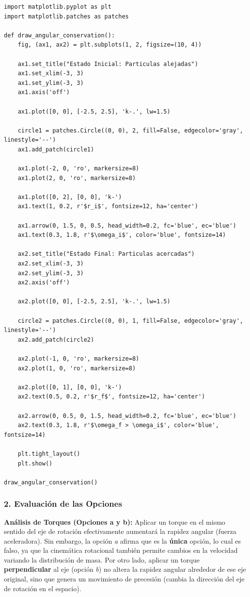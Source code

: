 \documentclass[12pt, a4paper]{article}
\begin{document}
\begin{lstlisting}
import matplotlib.pyplot as plt
import matplotlib.patches as patches

def draw_angular_conservation():
    fig, (ax1, ax2) = plt.subplots(1, 2, figsize=(10, 4))
    
    ax1.set_title("Estado Inicial: Particulas alejadas")
    ax1.set_xlim(-3, 3)
    ax1.set_ylim(-3, 3)
    ax1.axis('off')
    
    ax1.plot([0, 0], [-2.5, 2.5], 'k-.', lw=1.5)
    
    circle1 = patches.Circle((0, 0), 2, fill=False, edgecolor='gray', linestyle='--')
    ax1.add_patch(circle1)
    
    ax1.plot(-2, 0, 'ro', markersize=8)
    ax1.plot(2, 0, 'ro', markersize=8)
    
    ax1.plot([0, 2], [0, 0], 'k-')
    ax1.text(1, 0.2, r'$r_i$', fontsize=12, ha='center')
    
    ax1.arrow(0, 1.5, 0, 0.5, head_width=0.2, fc='blue', ec='blue')
    ax1.text(0.3, 1.8, r'$\omega_i$', color='blue', fontsize=14)
    
    ax2.set_title("Estado Final: Particulas acercadas")
    ax2.set_xlim(-3, 3)
    ax2.set_ylim(-3, 3)
    ax2.axis('off')
    
    ax2.plot([0, 0], [-2.5, 2.5], 'k-.', lw=1.5)
    
    circle2 = patches.Circle((0, 0), 1, fill=False, edgecolor='gray', linestyle='--')
    ax2.add_patch(circle2)
    
    ax2.plot(-1, 0, 'ro', markersize=8)
    ax2.plot(1, 0, 'ro', markersize=8)
    
    ax2.plot([0, 1], [0, 0], 'k-')
    ax2.text(0.5, 0.2, r'$r_f$', fontsize=12, ha='center')
    
    ax2.arrow(0, 0.5, 0, 1.5, head_width=0.2, fc='blue', ec='blue')
    ax2.text(0.3, 1.8, r'$\omega_f > \omega_i$', color='blue', fontsize=14)
    
    plt.tight_layout()
    plt.show()

draw_angular_conservation()
\end{lstlisting}

\subsubsection*{2. Evaluación de las Opciones}

\textbf{Análisis de Torques (Opciones a y b):}
Aplicar un torque en el mismo sentido del eje de rotación efectivamente aumentará la rapidez angular (fuerza aceleradora). Sin embargo, la opción \textit{a} afirma que es la \textbf{única} opción, lo cual es falso, ya que la cinemática rotacional también permite cambios en la velocidad variando la distribución de masa.
Por otro lado, aplicar un torque \textbf{perpendicular} al eje (opción \textit{b}) no altera la rapidez angular alrededor de ese eje original, sino que genera un movimiento de precesión (cambia la dirección del eje de rotación en el espacio).
\end{document}
